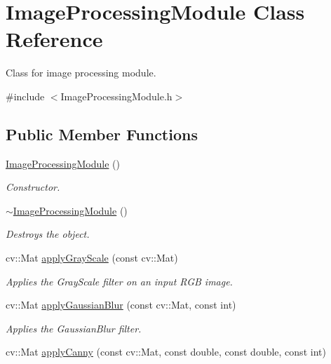 \hypertarget{class_image_processing_module}{}\section{Image\+Processing\+Module Class Reference}
\label{class_image_processing_module}


Class for image processing module.  




{\ttfamily \#include $<$Image\+Processing\+Module.\+h$>$}

\subsection*{Public Member Functions}
\begin{DoxyCompactItemize}
\item 
\mbox{\hyperlink{class_image_processing_module_a2c35e6db14ed55d6fc612076aaf1324b}{Image\+Processing\+Module}} ()
\begin{DoxyCompactList}\small\item\em Constructor. \end{DoxyCompactList}\item 
\mbox{\hyperlink{class_image_processing_module_a5f5c41eb1df297c230c777a2cac6e56a}{$\sim$\+Image\+Processing\+Module}} ()
\begin{DoxyCompactList}\small\item\em Destroys the object. \end{DoxyCompactList}\item 
cv\+::\+Mat \mbox{\hyperlink{class_image_processing_module_a5c10ac0f7d8b9d1ca0d3b42c5412d34c}{apply\+Gray\+Scale}} (const cv\+::\+Mat)
\begin{DoxyCompactList}\small\item\em Applies the Gray\+Scale filter on an input R\+GB image. \end{DoxyCompactList}\item 
cv\+::\+Mat \mbox{\hyperlink{class_image_processing_module_a5cd2ec10e64bf4f97f744ae1ec7dd437}{apply\+Gaussian\+Blur}} (const cv\+::\+Mat, const int)
\begin{DoxyCompactList}\small\item\em Applies the Gaussian\+Blur filter. \end{DoxyCompactList}\item 
cv\+::\+Mat \mbox{\hyperlink{class_image_processing_module_a19f01000f1607018deb4ff09b2fbc652}{apply\+Canny}} (const cv\+::\+Mat, const double, const double, const int)

\end{DoxyCompactItemize}
